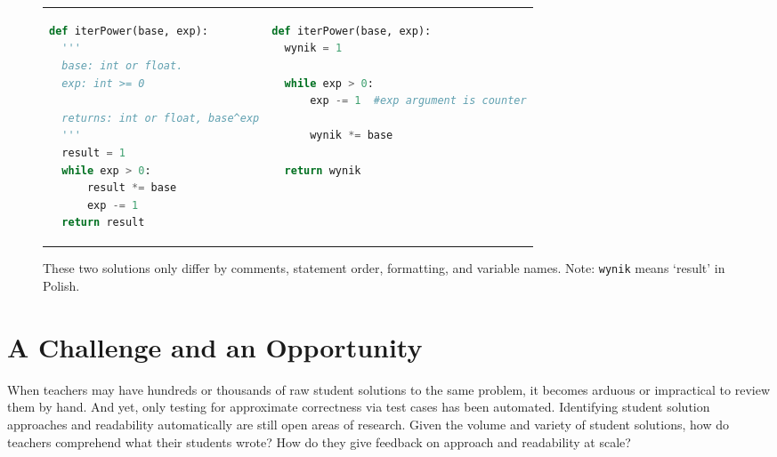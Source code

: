 \documentclass[12pt,twoside]{mitthesis}
\begin{document}
\begin{figure}
\begin{tabular}{ll}
\begin{minipage}{0.5\linewidth}
\begin{lstlisting}[basicstyle=\linespread{1.0}\ttfamily\footnotesize,language=python]
def iterPower(base, exp):
  '''
  base: int or float.
  exp: int >= 0

  returns: int or float, base^exp
  '''
  result = 1
  while exp > 0:
      result *= base
      exp -= 1
  return result
\end{lstlisting}
\end{minipage}
& 

\begin{minipage}{1.0\linewidth}
\begin{lstlisting}[basicstyle=\linespread{1.0}\ttfamily\footnotesize,language=python]
def iterPower(base, exp):
  wynik = 1

  while exp > 0:
      exp -= 1  #exp argument is counter

      wynik *= base

  return wynik
\end{lstlisting}
\end{minipage} 
\end{tabular}
\caption{These two solutions only differ by comments, statement order, formatting, and variable names. Note: \texttt{wynik} means `result' in Polish.}
\label{table:difflook}
\end{figure}

\section{A Challenge and an Opportunity}

When teachers may have hundreds or thousands of raw student solutions to the same problem, it becomes arduous or impractical to review them by hand. And yet, only testing for approximate correctness via test cases has been automated. Identifying student solution approaches and readability automatically are still open areas of research. Given the volume and variety of student solutions, how do teachers comprehend what their students wrote? How do they give feedback on approach and readability at scale? 
\end{document}
